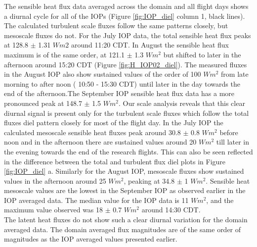 \documentclass[draft]{agujournal2019}
\begin{document}
The sensible heat flux data averaged across the domain and all flight days shows a diurnal cycle for all of the IOPs (Figure \ref{fig:IOP_diel} column 1, black lines). The calculated turbulent scale fluxes follow the same patterns closely, but mesoscale fluxes do not. For the July IOP data, the total sensible heat flux peaks at 128.8 $\pm$ 1.31 $W m2$ around 11:20 CDT. In August the sensible heat flux maximum is of the same order, at 121.1 $\pm$ 1.3 $W m^{2}$ but shifted to later in the afternoon around 15:20 CDT (Figure \ref{fig:H_IOP02_diel}). The measured fluxes in the August IOP also show sustained values of the order of 100 $W m^{2}$ from late morning to after noon ( 10:50 - 15:30 CDT) until later in the day towards the end of the afternoon.The September IOP sensible heat flux data has a more pronounced peak at 148.7 $\pm$ 1.5 $W m^{2}$. Our scale analysis reveals that this clear diurnal signal is present only for the turbulent scale fluxes which follow the total fluxes diel pattern closely for most of the flight day. In the July IOP the calculated mesoscale sensible heat fluxes peak around 30.8 $\pm$ 0.8 $W m^{2}$  before noon and in the afternoon there are sustained values around 20 $W m^{2}$ till later in the evening towards the end of the research flights. This can also be seen reflected in the difference between the total and turbulent flux diel plots in Figure \ref{fig:IOP_diel} a. Similarly for the August IOP, mesoscale fluxes show sustained values in the afternoon around 25 $W m^{2}$, peaking at 34.8 $\pm$ 1 $W m^{2}$. Sensible heat mesoscale values are the lowest in the September IOP as observed earlier in the IOP averaged data. The median value for the IOP data is 11 $W m^{2}$, and the maximum value observed was 18 $\pm$ 0.7 $W m^{2}$ around 14:30 CDT.\\
The latent heat fluxes do not show such a clear diurnal variation for the domain averaged data. The domain averaged flux magnitudes are of the same order of magnitudes as the IOP averaged values presented earlier. 
\end{document}
